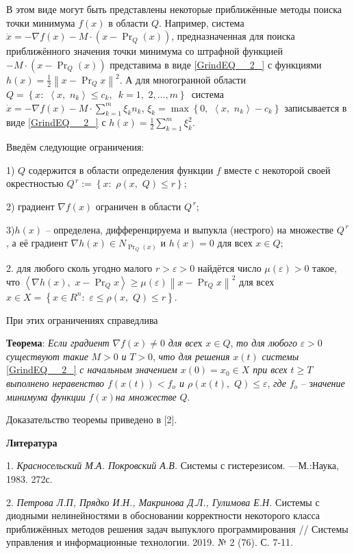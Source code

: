 В этом виде могут быть представлены некоторые приближённые методы поиска точки минимума $f\left(x\right)$ в области $Q$. Например, система $\dot{x}=-\nabla f\left(x\right)-M\cdot \left(x-\Pr _{Q} \left(x\right)\right)$, предназначенная для поиска приближённого значения точки минимума со штрафной функцией $-M\cdot \left(x-\Pr _{Q} \left(x\right)\right)$ представима в виде \eqref{GrindEQ__2_} с функциями $h\left(x\right)=\frac{1}{2} \left\| x-\Pr _{Q} x\right\| ^{2} $. А для многогранной области $Q=\left\{x:\, \, \left\langle x,\, \, n_{k} \right\rangle \le c_{k} ,\, \, \, k=1,\, \, 2,\ldots ,m\right\}\, $ система $\dot{x}=-\nabla f\left(x\right)-M\cdot \sum _{k=1}^{m}\xi _{k} n_{k}  $, $\xi _{k} =\max \left\{0,\, \, \left\langle x,\, \, n_{k} \right\rangle -c_{k} \right\}$ записывается в виде \eqref{GrindEQ__2_} с $h\left(x\right)=\frac{1}{2} \sum _{k=1}^{m}\xi _{k}^{2}  $.

 Введём следующие ограничения:

1) $Q$ содержится в области определения функции $f$ вместе с некоторой своей окрестностью $Q^{\, r} :=\left\{x:\, \, \rho \left(x,\, \, Q\right)\le r\right\}$;

2) градиент $\nabla f\left(x\right)$ ограничен в области $Q^{\, r} $;

3)$h\left(x\right)$ -- определена, дифференцируема и выпукла (нестрого) на множестве \textit{$Q^{\, r} $}, а её градиент $\nabla h\left(x\right)\in N_{\Pr _{Q} \left(x\right)} $ и $h\left(x\right)=0$ для всех $x\in Q$;

2. для любого сколь угодно малого \textit{$r>\varepsilon >0$} найдётся число $\mu \left(\varepsilon \right)>0$ такое, что $\left\langle \nabla h\left(x\right),\, \, x-\Pr _{Q} x\right\rangle \ge \mu \left(\varepsilon \right)\left\| x-\Pr _{Q} x\right\| ^{2} $ для всех $x\in X=\left\{x\in R^{n} :\, \, \varepsilon \le \rho \left(x,\, \, Q\right)\le r\right\}$.

При этих ограничениях справедлива

\textbf{Теорема}: \textit{Если градиент }$\nabla f\left(x\right)\ne 0$\textit{ для все}х $x\in Q$, \textit{то для любого }$\varepsilon >0$\textit{ существуют такие }$M>0$\textit{ и }$T>0$, \textit{что для решения }$x\left(t\right)$\textit{ системы }\eqref{GrindEQ__2_}\textit{ с начальным значением $x\left(0\right)=x_{0} \in X$ при всех $t\ge T$ выполнено неравенство $f\left(x\left(t\right)\right)<f_{o} $ и $\rho \left(x\left(t\right),\, \, Q\right)\le \varepsilon $}, \textit{где }$f_{o} $ -- з\textit{начение минимума функции }$f\left(x\right)$\textit{на множестве }$Q$.

 Доказательство теоремы приведено в [2].

\smallskip \centerline {\bf Литература} \nopagebreak

1.
{\it Красносельский М.А. Покровский А.В.} Системы с гистерезисом. ---М.:Наука, 1983. 272с.

2.
{\it  Петрова Л.П, Прядко И.Н., Макринова Д.Л., Гулимова Е.Н.} Системы с диодными нелинейностями в обосновании корректности некоторого класса приближённых методов решения задач выпуклого программирования  // Системы управления и информационные технологии. 2019. № 2 (76). С. 7-11.


